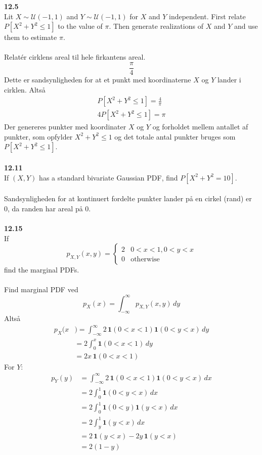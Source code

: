 \documentclass[12pt,a4paper]{report}
\author{Frederik Appel Vardinghus-Nielsen}
\begin{document}
\noindent\textbf{12.5}\\
Lit $X\sim \mathcal{U}(-1,1)$ and $Y\sim \mathcal{U}(-1,1)$ for $X$ and $Y$ independent. First relate $P[X^2+Y^2\leq 1]$ to the value of $\pi$. Then generate realizations of $X$ and $Y$ and use them to estimate $\pi$.\\\\
Relatér cirklens areal til hele firkantens areal.
\begin{equation}
\frac{\pi}{4}
\end{equation}
Dette er sandsynligheden for at et punkt med koordinaterne $X$ og $Y$ lander i cirklen. Altså
\begin{align*}
P[X^2+Y^2\leq 1]=\frac{4}{\pi}\\
4P[X^2+Y^2\leq 1]=\pi
\end{align*}
Der genereres punkter med koordinater $X$ og $Y$ og forholdet mellem antallet af punkter, som opfylder $X^2+Y^2\leq 1$ og det totale antal punkter bruges som $P[X^2+Y^2\leq 1]$.\\\\
\textbf{12.11}\\
If $(X,Y)$ has a standard bivariate Gaussian PDF, find $P[X^2+Y^2=10]$.\\\\
Sandsynligheden for at kontinuert fordelte punkter lander på en cirkel (rand) er 0, da randen har areal på 0.\\\\
\textbf{12.15}\\
If
\begin{equation}
p_{X,Y}(x,y)=
\begin{cases}
2&0<x<1,0<y<x\\
0&\text{otherwise}
\end{cases}
\end{equation}
find the marginal PDFs.\\\\
Find marginal PDF ved
\begin{equation}
p_X(x)=\int_{-\infty}^{\infty}\!p_{X,Y}(x,y)\,dy
\end{equation}
Altså
\begin{align*}
p_X(x&)=\int_{-\infty}^{\infty}\!2\,\mathbf{1}(0<x<1)\mathbf{1}(0<y<x)\,dy\\
&=2\int_0^x\!\mathbf{1}(0<x<1)\,dy\\
&=2x\,\mathbf{1}(0<x<1)
\end{align*}
For $Y$:
\begin{align*}
p_Y(y)&=\int_{-\infty}^{\infty}\!2\,\mathbf{1}(0<x<1)\mathbf{1}(0<y<x)\,dx\\
&=2\int_0^1\!\mathbf{1}(0<y<x)\,dx\\
&=2\int_0^1\mathbf{1}(0<y)\mathbf{1}(y<x)\,dx\\
&=2\int_y^1\mathbf{1}(y<x)\,dx\\
&=2\,\mathbf{1}(y<x)-2y\,\mathbf{1}(y<x)\\
&=2(1-y)
\end{align*}
\end{document}
